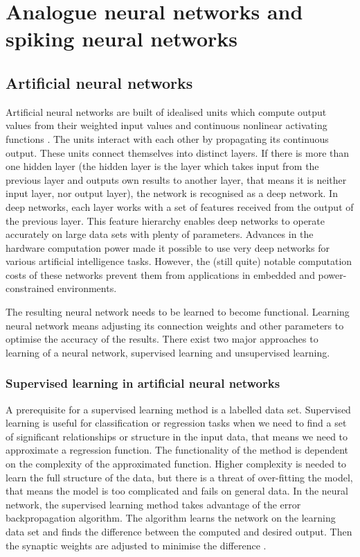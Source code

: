 \chapter{Analogue neural networks and spiking neural networks} \label{chap:02}

\section{Artificial neural networks}
Artificial neural networks are built of idealised units which compute output values from their weighted input values and continuous nonlinear activating functions \cite{tavanaeiDeepLearningSpiking2019}. The units interact with each other by propagating its continuous output. These units connect themselves into distinct layers. If there is more than one hidden layer (the hidden layer is the layer which takes input from the previous layer and outputs own results to another layer, that means it is neither input layer, nor output layer), the network is recognised as a deep network. In deep networks, each layer works with a set of features received from the output of the previous layer. This feature hierarchy enables deep networks to operate accurately on large data sets with plenty of parameters. Advances in the hardware computation power made it possible to use very deep networks for various artificial intelligence tasks. However, the (still quite) notable computation costs of these networks prevent them from applications in embedded and power-constrained environments. \par
The resulting neural network needs to be learned to become functional. Learning neural network means adjusting its connection weights and other parameters to optimise the accuracy of the results. There exist two major approaches to learning of a neural network, supervised learning and unsupervised learning.

\subsection{Supervised learning in artificial neural networks}
A prerequisite for a supervised learning method is a labelled data set. Supervised learning is useful for classification or regression tasks when we need to find a set of significant relationships or structure in the input data, that means we need to approximate a regression function. The functionality of the method is dependent on the complexity of the approximated function. Higher complexity is needed to learn the full structure of the data, but there is a threat of over-fitting the model, that means the model is too complicated and fails on general data. In the neural network, the supervised learning method takes advantage of the error backpropagation algorithm. The algorithm learns the network on the learning data set and finds the difference between the computed and desired output. Then the synaptic weights are adjusted to minimise the difference \cite{sathyaComparisonSupervisedUnsupervised2013}.

